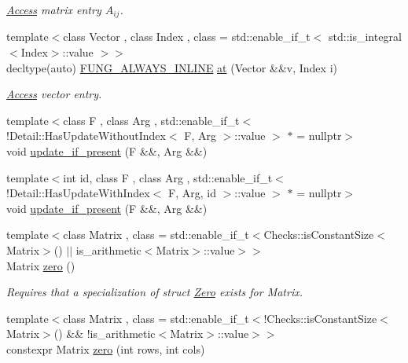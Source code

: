\begin{DoxyCompactItemize}
\begin{DoxyCompactList}\small\item\em \hyperlink{namespaceFunG_1_1Access}{Access} matrix entry $A_{ij}$. \end{DoxyCompactList}\item 
{\footnotesize template$<$class Vector , class Index , class  = std\+::enable\+\_\+if\+\_\+t$<$ std\+::is\+\_\+integral$<$\+Index$>$\+::value $>$$>$ }\\decltype(auto) \hyperlink{macros_8hh_a03b9da186125795e5afa49d0ef1cc32f}{F\+U\+N\+G\+\_\+\+A\+L\+W\+A\+Y\+S\+\_\+\+I\+N\+L\+I\+NE} \hyperlink{namespaceFunG_aa40271c9228c5ccee8a4973f27918630}{at} (Vector \&\&v, Index i)
\begin{DoxyCompactList}\small\item\em \hyperlink{namespaceFunG_1_1Access}{Access} vector entry. \end{DoxyCompactList}\item 
{\footnotesize template$<$class F , class Arg , std\+::enable\+\_\+if\+\_\+t$<$!\+Detail\+::\+Has\+Update\+Without\+Index$<$ F, Arg $>$\+::value $>$ $\ast$  = nullptr$>$ }\\void \hyperlink{namespaceFunG_a3b9d2e5d07b30c2ee26703b33e9adb9e}{update\+\_\+if\+\_\+present} (F \&\&, Arg \&\&)
\item 
{\footnotesize template$<$int id, class F , class Arg , std\+::enable\+\_\+if\+\_\+t$<$!\+Detail\+::\+Has\+Update\+With\+Index$<$ F, Arg, id $>$\+::value $>$ $\ast$  = nullptr$>$ }\\void \hyperlink{namespaceFunG_aed5ddbef97c98202e818bca2b74c75d2}{update\+\_\+if\+\_\+present} (F \&\&, Arg \&\&)
\item 
{\footnotesize template$<$class Matrix , class  = std\+::enable\+\_\+if\+\_\+t$<$\+Checks\+::is\+Constant\+Size$<$\+Matrix$>$() $\vert$$\vert$ is\+\_\+arithmetic$<$\+Matrix$>$\+::value$>$$>$ }\\Matrix \hyperlink{namespaceFunG_a649b4470d6def401959bfea3a368c48c}{zero} ()
\begin{DoxyCompactList}\small\item\em Requires that a specialization of struct \hyperlink{structFunG_1_1Zero}{Zero} exists for Matrix. \end{DoxyCompactList}\item 
{\footnotesize template$<$class Matrix , class  = std\+::enable\+\_\+if\+\_\+t$<$!\+Checks\+::is\+Constant\+Size$<$\+Matrix$>$() \&\& !is\+\_\+arithmetic$<$\+Matrix$>$\+::value$>$$>$ }\\constexpr Matrix \hyperlink{namespaceFunG_ae633433339ba30207aa526e54e3924b4}{zero} (int rows, int cols)

\end{DoxyCompactItemize}
